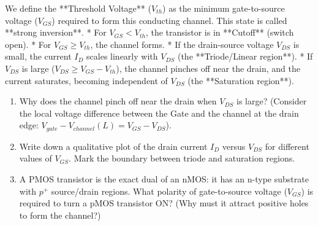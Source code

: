 \documentclass[12pt, a4paper]{book}
\begin{document}
\begin{center}
\end{center}

\begin{explobox}
We define the **Threshold Voltage** ($V_{th}$) as the minimum gate-to-source voltage ($V_{GS}$) required to form this conducting channel. This state is called **strong inversion**.
* For $V_{GS} < V_{th}$, the transistor is in **Cutoff** (switch open).
* For $V_{GS} \ge V_{th}$, the channel forms.
  * If the drain-source voltage $V_{DS}$ is small, the current $I_D$ scales linearly with $V_{DS}$ (the **Triode/Linear region**).
  * If $V_{DS}$ is large ($V_{DS} \ge V_{GS} - V_{th}$), the channel pinches off near the drain, and the current saturates, becoming independent of $V_{DS}$ (the **Saturation region**).
\begin{enumerate}[label=(\alph*), leftmargin=*]
  \item Why does the channel pinch off near the drain when $V_{DS}$ is large? (Consider the local voltage difference between the Gate and the channel at the drain edge: $V_{gate} - V_{channel}(L) = V_{GS} - V_{DS}$).
  \item Write down a qualitative plot of the drain current $I_D$ versus $V_{DS}$ for different values of $V_{GS}$. Mark the boundary between triode and saturation regions.
  \item A PMOS transistor is the exact dual of an nMOS: it has an n-type substrate with $p^+$ source/drain regions.
        What polarity of gate-to-source voltage ($V_{GS}$) is required to turn a pMOS transistor ON? (Why must it attract positive holes to form the channel?)
\end{enumerate}
\end{explobox}
\end{document}
